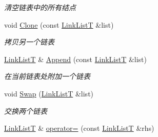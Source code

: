 \begin{DoxyCompactItemize}
\begin{DoxyCompactList}\small\item\em 清空链表中的所有结点 \end{DoxyCompactList}\item 
void \hyperlink{class_util_1_1_link_list_t_a8af74682abd66f3e337bbf1a82670367}{Clone} (const \hyperlink{class_util_1_1_link_list_t}{Link\-List\-T} \&list)
\begin{DoxyCompactList}\small\item\em 拷贝另一个链表 \end{DoxyCompactList}\item 
\hyperlink{class_util_1_1_link_list_t}{Link\-List\-T} \& \hyperlink{class_util_1_1_link_list_t_acc648d5a22f4aec6ae93caccc2c849bb}{Append} (const \hyperlink{class_util_1_1_link_list_t}{Link\-List\-T} \&list)
\begin{DoxyCompactList}\small\item\em 在当前链表处附加一个链表 \end{DoxyCompactList}\item 
void \hyperlink{class_util_1_1_link_list_t_a8c70c54bfd46772be4047634d7c01f1c}{Swap} (\hyperlink{class_util_1_1_link_list_t}{Link\-List\-T} \&list)
\begin{DoxyCompactList}\small\item\em 交换两个链表 \end{DoxyCompactList}\item 
\hypertarget{class_util_1_1_link_list_t_a3317850f32881fb26c819b795d7703d8}{\hyperlink{class_util_1_1_link_list_t}{Link\-List\-T} \& \hyperlink{class_util_1_1_link_list_t_a3317850f32881fb26c819b795d7703d8}{operator=} (const \hyperlink{class_util_1_1_link_list_t}{Link\-List\-T} \&rhs)}\label{class_util_1_1_link_list_t_a3317850f32881fb26c819b795d7703d8}


\end{DoxyCompactItemize}
